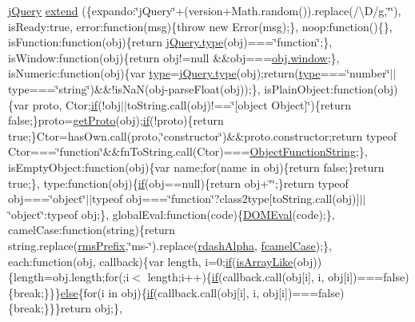 \begin{DoxyCompactItemize}
\hyperlink{jquery-3_82_81_8js_a609525712f1102566c2b03866ceb2bba}{j\+Query} \hyperlink{jquery-3_82_81_8js_a4363b81bf2e5008b7a6b50a2dd1c154b}{extend} (\{expando\+:\char`\"{}j\+Query\char`\"{}+(version+Math.\+random()).replace(/\textbackslash{}D/g,\char`\"{}\char`\"{}), is\+Ready\+:true, error\+:function(msg)\{throw new Error(msg);\}, noop\+:function()\{\}, is\+Function\+:function(obj)\{return \hyperlink{jquery-3_82_81_8js_a4c4533b7d49de290bb8cccd4e6f43349}{j\+Query.\+type}(obj)===\char`\"{}function\char`\"{};\}, is\+Window\+:function(obj)\{return obj!=null \&\&obj===\hyperlink{jquery-3_82_81_8js_ad55530ae1e5978df8e721017c1fc8466}{obj.\+window};\}, is\+Numeric\+:function(obj)\{var \hyperlink{jquery-3_82_81_8js_a4c4533b7d49de290bb8cccd4e6f43349}{type}=\hyperlink{jquery-3_82_81_8js_a4c4533b7d49de290bb8cccd4e6f43349}{j\+Query.\+type}(obj);return(\hyperlink{jquery-3_82_81_8js_a4c4533b7d49de290bb8cccd4e6f43349}{type}===\char`\"{}number\char`\"{}$\vert$$\vert$type===\char`\"{}string\char`\"{})\&\&!is\+NaN(obj-\/parse\+Float(obj));\}, is\+Plain\+Object\+:function(obj)\{var proto, Ctor;\hyperlink{jquery-3_82_81_8js_ad6cbdd9e1fadb4d9540fff933cdd6fdc}{if}(!obj$\vert$$\vert$to\+String.\+call(obj)!==\char`\"{}\mbox{[}object Object\mbox{]}\char`\"{})\{return false;\}proto=\hyperlink{jquery-3_82_81_8js_a8cfba932e510c58e75654c8bf0c22e8a}{get\+Proto}(obj);\hyperlink{jquery-3_82_81_8js_ad6cbdd9e1fadb4d9540fff933cdd6fdc}{if}(!proto)\{return true;\}Ctor=has\+Own.\+call(proto,\char`\"{}constructor\char`\"{})\&\&proto.\+constructor;return typeof Ctor===\char`\"{}function\char`\"{}\&\&fn\+To\+String.\+call(Ctor)===\hyperlink{jquery-3_82_81_8js_ad79aeb65b48e6765b43abcec785d570d}{Object\+Function\+String};\}, is\+Empty\+Object\+:function(obj)\{var name;for(name in obj)\{return false;\}return true;\}, type\+:function(obj)\{\hyperlink{jquery-3_82_81_8js_ad6cbdd9e1fadb4d9540fff933cdd6fdc}{if}(obj==null)\{return obj+\char`\"{}\char`\"{};\}return typeof obj===\char`\"{}object\char`\"{}$\vert$$\vert$typeof obj===\char`\"{}function\char`\"{}?class2type\mbox{[}to\+String.\+call(obj)\mbox{]}$\vert$$\vert$\char`\"{}object\char`\"{}\+:typeof obj;\}, global\+Eval\+:function(code)\{\hyperlink{jquery-3_82_81_8js_a26e7be743f83d9e2dd9862b2a6c72b84}{D\+O\+M\+Eval}(code);\}, camel\+Case\+:function(string)\{return string.\+replace(\hyperlink{jquery-3_82_81_8js_a3af3b994ecb718c298667ea5c52dfdbe}{rms\+Prefix},\char`\"{}ms-\/\char`\"{}).replace(\hyperlink{jquery-3_82_81_8js_a2d9c4c70bc32618862e2f587133cc6a6}{rdash\+Alpha}, \hyperlink{jquery-3_82_81_8js_a557c2142f8ded6728ea9eb2736b16cd8}{fcamel\+Case});\}, each\+:function(obj, callback)\{var length, i=0;\hyperlink{jquery-3_82_81_8js_ad6cbdd9e1fadb4d9540fff933cdd6fdc}{if}(\hyperlink{jquery-3_82_81_8js_a7f7399df462fe5c4e83dd7270da85e76}{is\+Array\+Like}(obj))\{length=obj.\+length;for(;i$<$ length;i++)\{\hyperlink{jquery-3_82_81_8js_ad6cbdd9e1fadb4d9540fff933cdd6fdc}{if}(callback.\+call(obj\mbox{[}i\mbox{]}, i, obj\mbox{[}i\mbox{]})===false)\{break;\}\}\}\hyperlink{jquery-3_82_81_8js_a0544c3fe466e421738dae463968b70ba}{else}\{for(i in obj)\{\hyperlink{jquery-3_82_81_8js_ad6cbdd9e1fadb4d9540fff933cdd6fdc}{if}(callback.\+call(obj\mbox{[}i\mbox{]}, i, obj\mbox{[}i\mbox{]})===false)\{break;\}\}\}return obj;\}, 
\end{DoxyCompactItemize}
